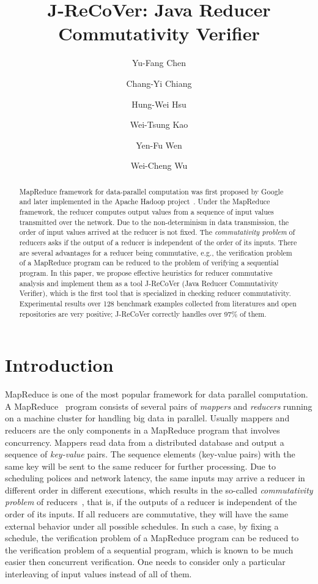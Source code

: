 \documentclass{llncs}
\title{J-ReCoVer: Java Reducer Commutativity Verifier}
\author{
Yu-Fang Chen\inst{1}\inst{2}
\and
Chang-Yi Chiang\inst{2}
\and
Hung-Wei Hsu\inst{1}
\and
Wei-Tsung Kao\inst{1}
\and
Yen-Fu Wen\inst{2}
\and
Wei-Cheng Wu\inst{1}
}
\institute
{
Institute of Information Science, Academia Sinica, Taiwan
\and
Graduate Institute of Information Management, National Taipei University, Taiwan
}
\begin{document}
\maketitle

\begin{abstract}

MapReduce framework for data-parallel computation was first proposed by Google~\cite{dean04} and later implemented in the Apache Hadoop project~\cite{hadoop}.
Under the MapReduce framework, the reducer computes output values from a sequence of input values transmitted over the network.  Due to the non-determinism in data transmission, the order of input values arrived at the reducer is not fixed.
The \emph{commutativity problem} of reducers asks if the output of a reducer is independent of the order of its inputs. There are several advantages for a reducer being commutative, e.g., the verification problem of a MapReduce program can be reduced to the problem of verifying a sequential program.
In this paper, we propose effective heuristics for reducer commutative analysis and implement them as a tool J-ReCoVer (Java Reducer Commutativity Verifier), which is the first tool that is specialized in checking reducer commutativity. Experimental results over 128 benchmark examples collected from literatures and open repositories are very positive; J-ReCoVer correctly handles over 97\% of them.


\end{abstract}

\section{Introduction}
\label{section:introduction}

MapReduce is one of the most popular framework for data parallel computation.
A MapReduce~\cite{dean04,hadoop} program consists of several pairs of \emph{mappers} and \emph{reducers} running on a machine cluster for handling big data in parallel. Usually mappers and reducers are the only components in a MapReduce program that involves concurrency. Mappers read data from a distributed database and output a sequence of \emph{key-value} pairs. The sequence elements (key-value pairs) with the same key will be sent to the same reducer for further processing. Due to scheduling polices and network latency, the same inputs may arrive a reducer in different order in different executions, which results in the so-called \emph{commutativity problem} of reducers~\cite{csallner13testing,xiao14mr,ChenHSW15,ChenSW16}, that is, if the outputs of a reducer is independent of the order of its inputs.
If all reducers are commutative, they will have the same external behavior under all possible schedules. In such a case, by fixing a schedule, the verification problem of a MapReduce program can be reduced to the verification problem of a sequential program, which is known to be much easier then concurrent verification. One needs to consider only a particular interleaving of input values instead of all of them.
\end{document}
